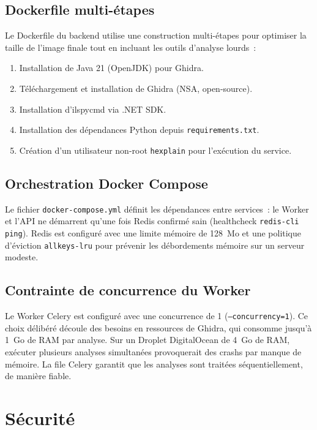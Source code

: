 \subsection{Dockerfile multi-étapes}

Le Dockerfile du backend utilise une construction multi-étapes pour optimiser la taille de l'image finale tout en incluant les outils d'analyse lourds~:
\begin{enumerate}
  \item Installation de Java 21 (OpenJDK) pour Ghidra.
  \item Téléchargement et installation de Ghidra (NSA, open-source).
  \item Installation d'ilspycmd via .NET SDK.
  \item Installation des dépendances Python depuis \texttt{requirements.txt}.
  \item Création d'un utilisateur non-root \texttt{hexplain} pour l'exécution du service.
\end{enumerate}

\subsection{Orchestration Docker Compose}

Le fichier \texttt{docker-compose.yml} définit les dépendances entre services~: le Worker et l'API ne démarrent qu'une fois Redis confirmé sain (healthcheck \texttt{redis-cli ping}). Redis est configuré avec une limite mémoire de 128~Mo et une politique d'éviction \texttt{allkeys-lru} pour prévenir les débordements mémoire sur un serveur modeste.

\subsection{Contrainte de concurrence du Worker}

Le Worker Celery est configuré avec une concurrence de 1 (\texttt{--concurrency=1}). Ce choix délibéré découle des besoins en ressources de Ghidra, qui consomme jusqu'à 1~Go de RAM par analyse. Sur un Droplet DigitalOcean de 4~Go de RAM, exécuter plusieurs analyses simultanées provoquerait des crashs par manque de mémoire. La file Celery garantit que les analyses sont traitées séquentiellement, de manière fiable.

\section{Sécurité}

